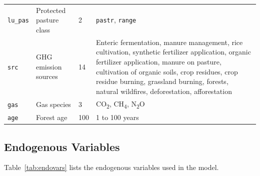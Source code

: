 \begin{xltabular}{\linewidth}{l X l X}
  \texttt{lu\_pas} & Protected pasture class & 2 & \texttt{pastr}, \texttt{range} \\
  \texttt{src}    & GHG emission sources & 14 &
    Enteric fermentation, manure management, rice cultivation, synthetic fertilizer application, 
    organic fertilizer application, manure on pasture, cultivation of organic soils, crop residues, 
    crop residue burning, grassland burning, forests, natural wildfires, deforestation, afforestation \\
  \texttt{gas}    & Gas species      & 3 & CO\textsubscript{2}, CH\textsubscript{4}, N\textsubscript{2}O \\
  \texttt{age}    & Forest age      & 100 & 1 to 100 years \\
\end{xltabular}




\subsection{Endogenous Variables}
Table~\ref{tab:endovars} lists the endogenous variables used in the model.

